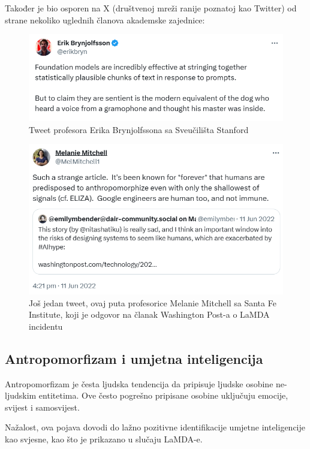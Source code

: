 \documentclass[diplomskirad]{fer}
\begin{document}
Također je bio osporen na X (društvenoj mreži ranije poznatoj kao Twitter) od strane nekoliko uglednih članova akademske zajednice:
\begin{figure}[htb]
  \centering
  \includegraphics[width=1\linewidth]{Figures/LaMDA tweet 1.png} 
  \caption{Tweet profesora Erika Brynjolfssona sa Sveučilišta Stanford}
  \label{slk:LaMDA_tweet_1}
\end{figure}
\begin{figure}[htb]
  \centering
  \includegraphics[width=1\linewidth]{Figures/LaMDA tweet 2.png} 
  \caption{Još jedan tweet, ovaj puta profesorice Melanie Mitchell sa Santa Fe Institute, koji je odgovor na članak Washington Post-a o LaMDA incidentu}
  \label{slk:LaMDA_tweet_2}
\end{figure}
\subsection{Antropomorfizam i umjetna inteligencija}

Antropomorfizam je česta ljudska tendencija da pripisuje ljudske osobine ne-ljudskim entitetima. Ove često pogrešno pripisane osobine uključuju emocije, svijest i samosvijest.

Nažalost, ova pojava dovodi do lažno pozitivne identifikacije umjetne inteligencije kao svjesne, kao što je prikazano u slučaju LaMDA-e.
\end{document}
